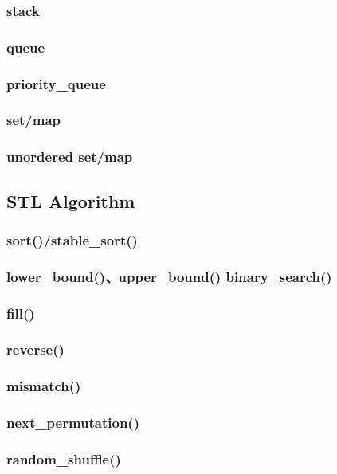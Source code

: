 \documentclass{article}
\begin{document}
\subsubsection{stack}

\subsubsection{queue}

\subsubsection{priority\_queue}

\subsubsection{set/map}

\subsubsection{unordered set/map}

\subsection{STL Algorithm}
\subsubsection{sort()/stable\_sort()}

\subsubsection{lower\_bound()、upper\_bound() binary\_search()}

\subsubsection{fill()}

\subsubsection{reverse()}

\subsubsection{mismatch()}

\subsubsection{next\_permutation()}

\subsubsection{random\_shuffle()}
\end{document}
